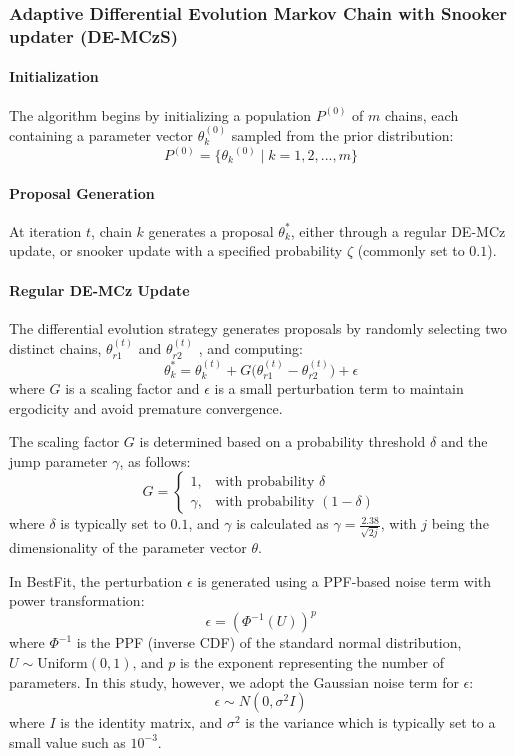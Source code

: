 \subsubsection{Adaptive Differential Evolution Markov Chain with Snooker updater (DE-MCzS)}
\paragraph{Initialization}
The algorithm begins by initializing a population $P^{(0)}$ of $m$ chains, each containing a parameter vector $\theta_k^{(0)}$ sampled from the prior distribution:
$$P^{(0)} = \{{\theta_k}^{(0)}\mid k =1,2, ...,m\}$$

\paragraph{Proposal Generation} 
At iteration $t$, chain $k$ generates a proposal $\theta_k^*$, either through a regular DE-MCz update, or snooker update with a specified probability $\zeta$ (commonly set to $0.1$).

\paragraph{Regular DE-MCz Update}
The differential evolution strategy generates proposals by randomly selecting two distinct chains, $\theta_{r1}^{(t)}$ and $\theta_{r2}^{(t)}$ , and computing:
$$\theta_k^* = \theta_k^{(t)} + G\big( \theta_{r1}^{(t)} -\theta_{r2}^{(t)} \big) + \epsilon$$
where $G$ is a scaling factor and $\epsilon$ is a small perturbation term to maintain ergodicity and avoid premature convergence.

The scaling factor $G$ is determined based on a probability threshold $\delta$ and the jump parameter $\gamma$, as follows:
$$G = \begin{cases} 
1, & \text{with probability } \delta \\ 
\gamma, & \text{with probability } (1 - \delta) 
\end{cases}$$
where $\delta$ is typically set to $0.1$, and $\gamma$ is calculated as $\gamma = \frac{2.38}{\sqrt{2j}}$, with $j$ being the dimensionality of the parameter vector $\theta$. 

In BestFit, the perturbation $\epsilon$ is generated using a PPF-based noise term with power transformation:
$$\epsilon = (\Phi^{-1}(U))^p$$
where $\Phi^{-1}$ is the PPF (inverse CDF) of the standard normal distribution, $U \sim \text{Uniform} (0, 1)$, and $p$ is the exponent representing the number of parameters.
In this study, however, we adopt the Gaussian noise term for  $\epsilon$:
$$\epsilon \sim N(0, \sigma^2I)$$
where $I$ is the identity matrix, and $\sigma^2$ is the variance which is typically set to a small value such as $10^{-3}$.

